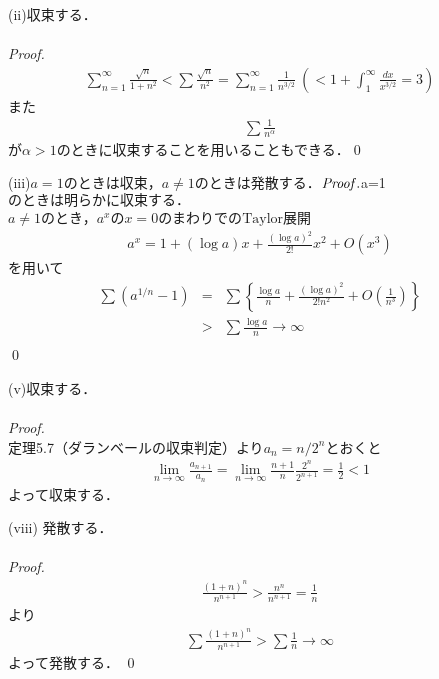 \documentclass[dvipdfmx,uplatex,11pt]{jsarticle}
\theoremstyle{definition}
\begin{document}
	\begin{screen}
	(ii)収束する．\\
	\dotfill \\
	{\it Proof.}
	\begin{eqnarray*}
	\sum ^{\infty}_{n=1}\frac{\sqrt{n}}{1+n^2}<\sum \frac{\sqrt{n}}{n^2}=\sum^{\infty}_{n=1}\frac{1}{n^{3/2}}~\left(<1+\int^{\infty}_{1}\frac{dx}{x^{3/2}}=3\right)
	\end{eqnarray*}
	また
	\begin{eqnarray*}
	\sum \frac{1}{n^\alpha}
	\end{eqnarray*}
	が$\alpha >1$のときに収束することを用いることもできる．\qed
	\end{screen}
	\begin{screen}
	(iii)$a=1$のときは収束，$a \neq 1$のときは発散する．$\\
	\dotfill \\
	{\it Proof.}\\
	$a=1$のときは明らかに収束する．$\\
	$a \neq 1$のとき，$a^x$の$x=0$のまわりでの$\mathrm{Taylor}$展開
	\begin{eqnarray*}
	a^x=1+(\log a)x+\frac{(\log a)^2}{2!}x^2+O(x^3)
	\end{eqnarray*}
	を用いて
	\begin{eqnarray*}
	\sum (a^{1/n}-1)&=&\sum \left\{ \frac{\log a}{n}+\frac{(\log a)^2}{2!n^2}+O\left(\frac{1}{n^3}\right)\right\}\\
	&>&\sum \frac{\log a}{n} \rightarrow \infty\\
	\end{eqnarray*}
	\qed
	\end{screen}
	
	\begin{screen}
	(v)収束する．\\
	\dotfill \\
	{\it Proof.}\\
	定理5.7（ダランベールの収束判定）より$a_n=n/2^n$とおくと
	\begin{eqnarray*}
	\lim_{n \to \infty}\frac{a_{n+1}}{a_n}=\lim_{n \to \infty}\frac{n+1}{n}\frac{2^n}{2^{n+1}}=\frac{1}{2}<1
	\end{eqnarray*}
	よって収束する．
	\end{screen}
	
	\begin{screen}
	(viii)
	発散する．\\
	\dotfill \\
	{\it Proof.}
	\begin{eqnarray*}
	\frac{(1+n)^n}{n^{n+1}}>\frac{n^n}{n^{n+1}}=\frac{1}{n}
	\end{eqnarray*}
	より
	\begin{eqnarray*}
	\sum \frac{(1+n)^n}{n^{n+1}}>\sum \frac{1}{n} \rightarrow \infty
	\end{eqnarray*}
	よって発散する． \qed
	\end{screen}
	
\end{document}

